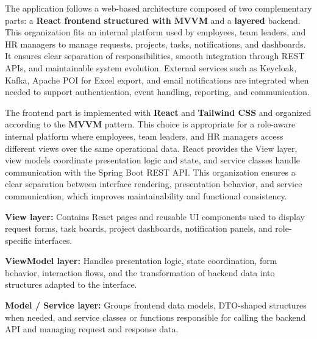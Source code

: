 
{\fontsize{12}{18}\selectfont
\setlength{\parindent}{1.2cm}
\setlength{\parskip}{6pt}

\indent The application follows a web-based architecture composed of two complementary parts: a \textbf{React frontend structured with MVVM} and a \textbf{layered} backend. This organization fits an internal platform used by employees, team leaders, and HR managers to manage requests, projects, tasks, notifications, and dashboards. It ensures clear separation of responsibilities, smooth integration through REST APIs, and maintainable system evolution. External services such as Keycloak, Kafka, Apache POI for Excel export, and email notifications are integrated when needed to support authentication, event handling, reporting, and communication. \cite{react_docs,spring_boot_docs,keycloak_docs,kafka_docs,apache_poi_docs}

}

\vspace{6pt}


{\fontsize{12}{18}\selectfont
\setlength{\parindent}{1.2cm}
\setlength{\parskip}{6pt}

\indent The frontend part is implemented with \textbf{React} and \textbf{Tailwind CSS} and organized according to the \textbf{MVVM} pattern. This choice is appropriate for a role-aware internal platform where employees, team leaders, and HR managers access different views over the same operational data. React provides the View layer, view models coordinate presentation logic and state, and service classes handle communication with the Spring Boot REST API. This organization ensures a clear separation between interface rendering, presentation behavior, and service communication, which improves maintainability and functional consistency. \cite{react_docs,tailwind_docs}

\begin{itemize}[leftmargin=2cm, itemsep=4pt]
  {\fontsize{12}{18}\selectfont
  \item \textbf{View layer:} Contains React pages and reusable UI components used to display request forms, task boards, project dashboards, notification panels, and role-specific interfaces.
  \item \textbf{ViewModel layer:} Handles presentation logic, state coordination, form behavior, interaction flows, and the transformation of backend data into structures adapted to the interface.
  \item \textbf{Model / Service layer:} Groups frontend data models, DTO-shaped structures when needed, and service classes or functions responsible for calling the backend API and managing request and response data.
  }
\end{itemize}

}


